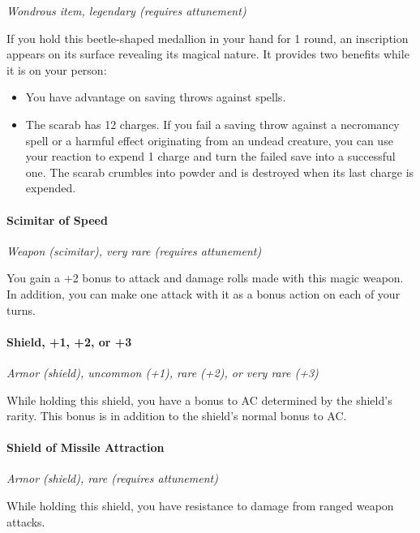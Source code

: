 \documentclass[
]{article}
\providecommand{\tightlist}{%
  \setlength{\itemsep}{0pt}\setlength{\parskip}{0pt}}
\begin{document}
\emph{Wondrous item, legendary (requires attunement)}

If you hold this beetle-shaped medallion in your hand for 1 round, an
inscription appears on its surface revealing its magical nature. It
provides two benefits while it is on your person:

\begin{itemize}
\tightlist
\item
  You have advantage on saving throws against spells.
\item
  The scarab has 12 charges. If you fail a saving throw against a
  necromancy spell or a harmful effect originating from an undead
  creature, you can use your reaction to expend 1 charge and turn the
  failed save into a successful one. The scarab crumbles into powder and
  is destroyed when its last charge is expended.
\end{itemize}

\hypertarget{scimitar-of-speed}{%
\paragraph{Scimitar of Speed}\label{scimitar-of-speed}}

\emph{Weapon (scimitar), very rare (requires attunement)}

You gain a +2 bonus to attack and damage rolls made with this magic
weapon. In addition, you can make one attack with it as a bonus action
on each of your turns.

\hypertarget{shield-1-2-or-3}{%
\paragraph{Shield, +1, +2, or +3}\label{shield-1-2-or-3}}

\emph{Armor (shield), uncommon (+1), rare (+2), or very rare (+3)}

While holding this shield, you have a bonus to AC determined by the
shield's rarity. This bonus is in addition to the shield's normal bonus
to AC.

\hypertarget{shield-of-missile-attraction}{%
\paragraph{Shield of Missile
Attraction}\label{shield-of-missile-attraction}}

\emph{Armor (shield), rare (requires attunement)}

While holding this shield, you have resistance to damage from ranged
weapon attacks.
\end{document}
